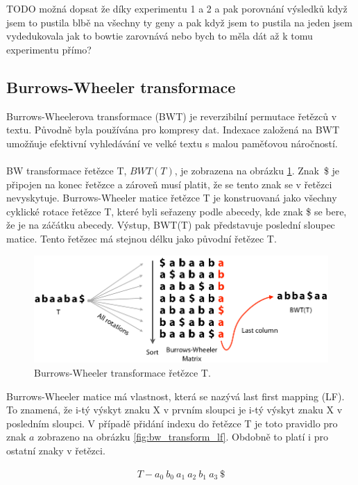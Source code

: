 \documentclass[czech,DP]{thesiskiv}
\numberwithin{equation}{section}
\begin{document}
TODO možná dopsat že díky experimentu 1 a 2 a pak porovnání výsledků když jsem to pustila blbě na všechny ty geny a pak když jsem to pustila na jeden jsem vydedukovala jak to bowtie zarovnává nebo bych to měla dát až k tomu experimentu přímo? 

\subsection{Burrows-Wheeler transformace}
Burrows-Wheelerova transformace (BWT) je reverzibilní permutace řetězců v textu. Původně byla používána pro kompresy dat. Indexace založená na BWT umožňuje efektivní vyhledávání ve velké textu s malou paměťovou náročností. 
\\
\\
BW transformace řetězce T, $BWT(T)$, je zobrazena na obrázku \ref{fig:bw_transform_1}. Znak~\$ je připojen na konec řetězce a zároveň musí platit, že se tento znak se v řetězci nevyskytuje. Burrows-Wheeler matice řetězce T je konstruovaná jako všechny cyklické rotace řetězce T, které byli seřazeny podle abecedy, kde znak \$ se bere, že je na záčátku abecedy. Výstup, BWT(T) pak představuje poslední sloupec matice. Tento řetězec má stejnou délku jako původní řetězec T. \cite{bowtie} 

\begin{figure}[H]		
		\centering
		\includegraphics[width=.8\textwidth]{./img/BWT_1.png}
		\caption{Burrows-Wheeler transformace řetězce T. \cite{bw_transform}}
		\label{fig:bw_transform_1}
\end{figure}

\noindent
Burrows-Wheeler matice má vlastnost, která se nazývá last first mapping (LF). To znamená, že i-tý výskyt znaku X v prvním sloupci je i-tý výskyt znaku X v posledním sloupci. V případě přidání indexu do řetězce T je toto pravidlo pro znak $a$ zobrazeno na obrázku \ref{fig:bw_transform_lf}. Obdobně to platí i pro ostatní znaky v řetězci.

\begin{align}
   \label{rerezec_t} T - a_0 \: b_0 \: a_1 \: a_2 \: b_1 \: a_3 \: \$
\end{align}
\end{document}

